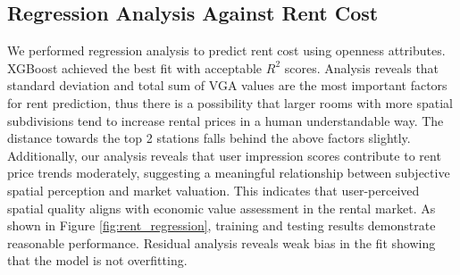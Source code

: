 \documentclass[11pt,a4paper]{article}
\begin{document}
\begin{multicols}{2}



\subsection{Regression Analysis Against Rent Cost}
We performed regression analysis to predict rent cost using openness attributes. XGBoost achieved 
the best fit with acceptable $R^2$ scores. Analysis reveals that standard deviation and total sum 
of VGA values are the most important factors for rent prediction, thus there is a possibility 
that larger rooms with more spatial subdivisions tend to increase rental prices in a human understandable way.
The distance towards the top 2 stations falls behind the above factors slightly.
Additionally, our analysis reveals that user impression scores contribute to rent price trends moderately, 
suggesting a meaningful relationship between subjective spatial perception and market valuation. 
This indicates that user-perceived spatial quality aligns with economic value assessment in the rental market.
As shown in Figure \ref{fig:rent_regression}, training and testing results demonstrate reasonable performance. 
Residual analysis reveals weak bias in the fit showing that the model is not overfitting.


\end{multicols}
\end{document}
